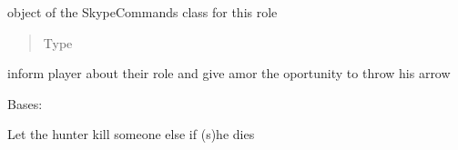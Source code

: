 \documentclass[letterpaper,10pt,english]{sphinxmanual}
\begin{document}
\begin{fulllineitems}
\begin{fulllineitems}
\begin{quote}
\begin{description}
\end{description}\end{quote}

\end{fulllineitems}



\begin{fulllineitems}
object of the SkypeCommands class for this role
\begin{quote}\begin{description}
\item[{Type}] \leavevmode
{\hyperref[\detokenize{chatwolf:chatwolf.skypecommands.SkypeCommands}]{}}

\end{description}\end{quote}

\end{fulllineitems}



\begin{fulllineitems}
inform player about their role and give amor the oportunity to throw his arrow

\end{fulllineitems}



\begin{fulllineitems}
\end{fulllineitems}


\end{fulllineitems}



\begin{fulllineitems}
Bases: 


\begin{fulllineitems}
Let the hunter kill someone else if (s)he dies

\end{fulllineitems}


\end{fulllineitems}
\end{document}
